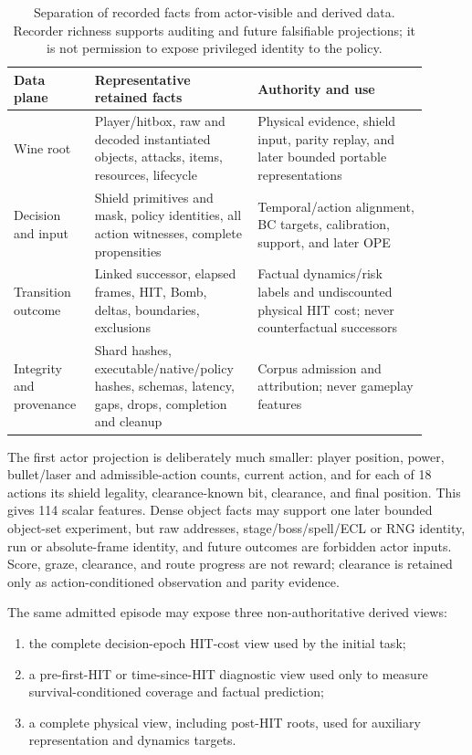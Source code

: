 \documentclass[11pt]{article}
\begin{document}
\begin{table}[H]
\centering
\small
\begin{tabular}{@{}>{\raggedright\arraybackslash}p{0.18\linewidth}
                    >{\raggedright\arraybackslash}p{0.34\linewidth}
                    >{\raggedright\arraybackslash}p{0.38\linewidth}@{}}
\toprule
Data plane & Representative retained facts & Authority and use \\
\midrule
Wine root & Player/hitbox, raw and decoded instantiated objects, attacks,
items, resources, lifecycle & Physical evidence, shield input, parity replay,
and later bounded portable representations \\
Decision and input & Shield primitives and mask, policy identities, all action
witnesses, complete propensities & Temporal/action alignment, BC targets,
calibration, support, and later OPE \\
Transition outcome & Linked successor, elapsed frames, HIT, Bomb, deltas,
boundaries, exclusions & Factual dynamics/risk labels and undiscounted physical
HIT cost; never counterfactual successors \\
Integrity and provenance & Shard hashes, executable/native/policy hashes, schemas,
latency, gaps, drops, completion and cleanup & Corpus admission and attribution;
never gameplay features \\
\bottomrule
\end{tabular}
\caption{Separation of recorded facts from actor-visible and derived data.
Recorder richness supports auditing and future falsifiable projections; it is
not permission to expose privileged identity to the policy.}
\label{tab:data-planes}
\end{table}

The first actor projection is deliberately much smaller: player position,
power, bullet/laser and admissible-action counts, current action, and for each
of 18 actions its shield legality, clearance-known bit, clearance, and final
position.  This gives 114 scalar features.  Dense object facts may support one
later bounded object-set experiment, but raw addresses, stage/boss/spell/ECL or
RNG identity, run or absolute-frame identity, and future outcomes are forbidden
actor inputs.  Score, graze, clearance, and route progress are not reward;
clearance is retained only as action-conditioned observation and parity
evidence.

The same admitted episode may expose three non-authoritative derived views:

\begin{enumerate}
  \item the complete decision-epoch HIT-cost view used by the initial task;
  \item a pre-first-HIT or time-since-HIT diagnostic view used only to measure
        survival-conditioned coverage and factual prediction;
  \item a complete physical view, including post-HIT roots, used for auxiliary
        representation and dynamics targets.
\end{enumerate}
\end{document}
